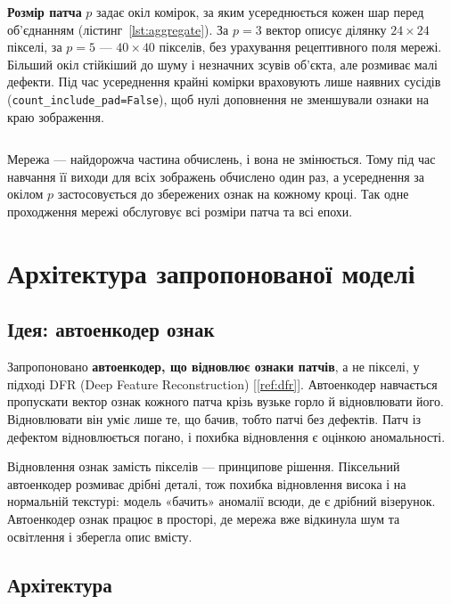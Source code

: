 \documentclass[14pt,a4paper]{extreport}
\begin{document}
\textbf{Розмір патча} $p$ задає окіл комірок, за яким усереднюється кожен шар перед об'єднанням (лістинг~\ref{lst:aggregate}). За $p = 3$ вектор описує ділянку $24 \times 24$ пікселі, за $p = 5$ --- $40 \times 40$ пікселів, без урахування рецептивного поля мережі. Більший окіл стійкіший до шуму і незначних зсувів об'єкта, але розмиває малі дефекти. Під час усереднення крайні комірки враховують лише наявних сусідів (\texttt{count\_include\_pad=False}), щоб нулі доповнення не зменшували ознаки на краю зображення.

\inputminted[firstline=98,lastline=130]{python}{../src/mk1/patches.py}
\label{lst:aggregate}

Мережа --- найдорожча частина обчислень, і вона не змінюється. Тому під час навчання її виходи для всіх зображень обчислено один раз, а усереднення за окілом $p$ застосовується до збережених ознак на кожному кроці. Так одне проходження мережі обслуговує всі розміри патча та всі епохи.

\section{Архітектура запропонованої моделі}
\label{sec:model}

\subsection{Ідея: автоенкодер ознак}

Запропоновано \textbf{автоенкодер, що відновлює ознаки патчів}, а не пікселі, у підході DFR (Deep Feature Reconstruction) [\ref{ref:dfr}]. Автоенкодер навчається пропускати вектор ознак кожного патча крізь вузьке горло й відновлювати його. Відновлювати він уміє лише те, що бачив, тобто патчі без дефектів. Патч із дефектом відновлюється погано, і похибка відновлення є оцінкою аномальності.

Відновлення ознак замість пікселів --- принципове рішення. Піксельний автоенкодер розмиває дрібні деталі, тож похибка відновлення висока і на нормальній текстурі: модель «бачить» аномалії всюди, де є дрібний візерунок. Автоенкодер ознак працює в просторі, де мережа вже відкинула шум та освітлення і зберегла опис вмісту.

\subsection{Архітектура}
\end{document}
